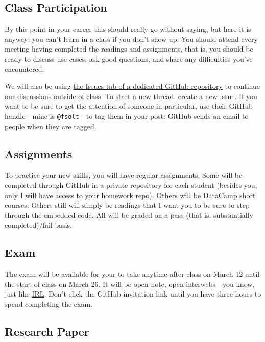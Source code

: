 \documentclass[]{article}
\begin{document}
\hypertarget{class-participation}{%
\subsection{Class Participation}\label{class-participation}}

By this point in your career this should really go without saying, but
here it is anyway: you can't learn in a class if you don't show up. You
should attend every meeting having completed the readings and
assignments, that is, you should be ready to discuss use cases, ask good
questions, and share any difficulties you've encountered.

We will also be using
\href{https://github.com/cmcr-class/Discussion/issues}{the Issues tab of
a dedicated GitHub repository} to continue our discussions outside of
class. To start a new thread, create a new issue. If you want to be sure
to get the attention of someone in particular, use their GitHub
handle---mine is \texttt{@fsolt}---to tag them in your post: GitHub
sends an email to people when they are tagged.

\hypertarget{assignments}{%
\subsection{Assignments}\label{assignments}}

To practice your new skills, you will have regular assignments. Some
will be completed through GitHub in a private repository for each
student (besides you, only I will have access to your homework repo).
Others will be DataCamp short courses. Others still will simply be
readings that I want you to be sure to step through the embedded code.
All will be graded on a pass (that is, substantially completed)/fail
basis.

\hypertarget{exam}{%
\subsection{Exam}\label{exam}}

The exam will be available for your to take anytime after class on March
12 until the start of class on March 26. It will be open-note,
open-interwebs---you know, just like
\href{http://www.theallium.com/engineering/computer-programming-to-be-officially-renamed-googling-stackoverflow/}{IRL}.
Don't click the GitHub invitation link until you have three hours to
spend completing the exam.

\hypertarget{research-paper}{%
\subsection{Research Paper}\label{research-paper}}
\end{document}
